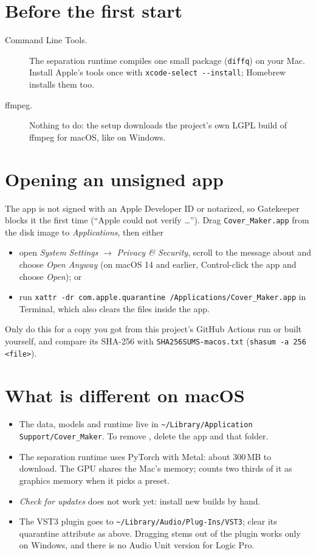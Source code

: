 \documentclass{covermaker}
\begin{document}
\section{Before the first start}
\begin{description}
  \item[Command Line Tools.] The separation runtime compiles one small
  package (\texttt{diffq}) on your Mac. Install Apple's tools once with
  \texttt{xcode-select -{}-install}; Homebrew installs them too.
  \item[ffmpeg.] Nothing to do: the setup downloads the project's own LGPL
  build of ffmpeg for macOS, like on Windows.
\end{description}

\section{Opening an unsigned app}
The app is not signed with an Apple Developer ID or notarized, so Gatekeeper
blocks it the first time (``Apple could not verify \ldots''). Drag
\texttt{Cover\_Maker.app} from the disk image to \emph{Applications}, then
either
\begin{itemize}
  \item open \emph{System Settings} $\rightarrow$ \emph{Privacy \& Security},
  scroll to the message about \CM{} and choose \emph{Open Anyway} (on macOS
  14 and earlier, Control-click the app and choose \emph{Open}); or
  \item run \texttt{xattr -dr com.apple.quarantine /Applications/Cover\_Maker.app}
  in Terminal, which also clears the files inside the app.
\end{itemize}
Only do this for a copy you got from this project's GitHub Actions run or
built yourself, and compare its SHA-256 with \texttt{SHA256SUMS-macos.txt}
(\texttt{shasum -a 256 <file>}).

\section{What is different on macOS}
\begin{itemize}
  \item The data, models and runtime live in
  \texttt{\textasciitilde/Library/Application Support/Cover\_Maker}. To remove
  \CM{}, delete the app and that folder.
  \item The separation runtime uses PyTorch with Metal: about 300\,MB to
  download. The GPU shares the Mac's memory; \CM{} counts two thirds of it as
  graphics memory when it picks a preset.
  \item \emph{Check for updates} does not work yet: install new builds by
  hand.
  \item The VST3 plugin goes to \texttt{\textasciitilde/Library/Audio/Plug-Ins/VST3};
  clear its quarantine attribute as above. Dragging stems out of the plugin
  works only on Windows, and there is no Audio Unit version for Logic Pro.
\end{itemize}
\end{document}
